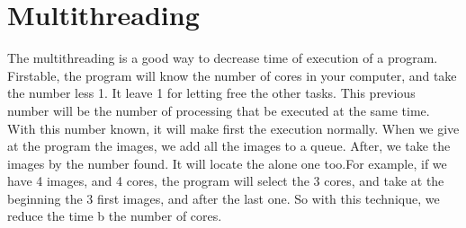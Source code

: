 \section{Multithreading}

The multithreading is a good way to decrease time of execution of a program. Firstable, the program will know the number of cores in your computer, and take the number less 1. It leave 1 for letting free the other tasks.
This previous number will be the number of processing that be executed at the same time. With this number known, it will make first the execution normally. When we give at the program the images, we add all the images to a queue. After, we take the images by the number found. It will locate the alone one too.For example, if we have 4 images, and 4 cores, the program will select the 3 cores, and take at the beginning the 3 first images, and after the last one.
So with this technique, we reduce the time b the number of cores.


  
  
  